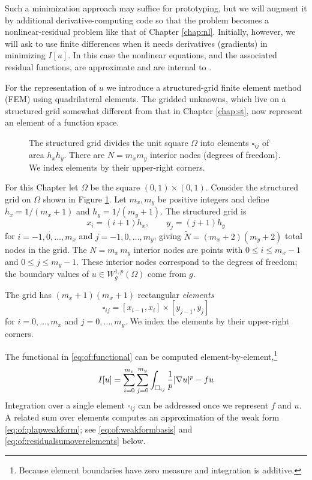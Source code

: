Such a minimization approach may suffice for prototyping, but we will augment it by additional derivative-computing code so that the problem becomes a nonlinear-residual problem like that of Chapter \ref{chap:nl}.  Initially, however, we will ask \PETSc to use finite differences when it needs derivatives (gradients) in minimizing $I[u]$.  In this case the nonlinear equations, and the associated residual functions, are approximate and are internal to \PETSc.

For the representation of $u$ we introduce a structured-grid finite element method (FEM) using quadrilateral elements.  The gridded unknowns, which live on a structured grid somewhat different from that in Chapter \ref{chap:st}, now represent an element of a function space.

\begin{figure}

\caption{The structured grid divides the unit square $\Omega$ into elements $\square_{ij}$ of area $h_x h_y$.  There are $N=m_x m_y$ interior nodes (degrees of freedom).  We index elements by their upper-right corners.}
\label{fig:of:q1grid}
\end{figure}

For this Chapter let $\Omega$ be the square $(0,1)\times (0,1)$.  Consider the structured grid on $\Omega$ shown in Figure \ref{fig:of:q1grid}.  Let $m_x,m_y$ be positive integers and define $h_x = 1/(m_x+1)$ and $h_y = 1/(m_y+1)$.  The structured grid is
\begin{equation}
x_i = (i+1) h_x, \qquad y_j = (j+1) h_y \label{eq:of:structuredgridindexing}
\end{equation}
for $i=-1,0,\dots,m_x$ and $j=-1,0,\dots,m_y$, giving $\tilde N = (m_x+2)(m_y+2)$ total nodes in the grid.  The $N=m_x\, m_y$ interior nodes are points with $0 \le i \le m_x-1$ and $0 \le j \le m_y-1$.  These interior nodes correspond to the degrees of freedom; the boundary values of $u\in W_g^{1,p}(\Omega)$ come from $g$. 

The grid has $(m_x+1)(m_x+1)$ rectangular \emph{elements}
   $$\square_{ij} = [x_{i-1},x_i] \times [y_{j-1},y_j]$$
for $i=0,\dots,m_x$ and $j=0,\dots,m_y$.  We index the elements by their upper-right corners.

The functional in \eqref{eq:of:functional} can be computed element-by-element,\footnote{Because element boundaries have zero measure and integration is additive.}
\begin{equation}
I[u] = \sum_{i=0}^{m_x} \sum_{j=0}^{m_y} \int_{\square_{ij}} \frac{1}{p} |\nabla u|^p - fu  \label{eq:of:sumoverelements}
\end{equation}
Integration over a single element $\square_{ij}$ can be addressed once we represent $f$ and $u$.  A related sum over elements computes an approximation of the weak form \eqref{eq:of:plapweakform}; see \eqref{eq:of:weakformbasis} and \eqref{eq:of:residualsumoverelements} below.

